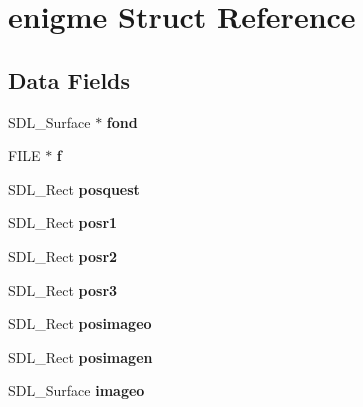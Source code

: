 \hypertarget{structenigme}{}\section{enigme Struct Reference}
\label{structenigme}
\subsection*{Data Fields}
\begin{DoxyCompactItemize}
\item 
S\+D\+L\+\_\+\+Surface $\ast$ {\bfseries fond}\hypertarget{structenigme_a0a53a21d5fa8a66dd6cece93a3d4dedf}{}\label{structenigme_a0a53a21d5fa8a66dd6cece93a3d4dedf}

\item 
F\+I\+LE $\ast$ {\bfseries f}\hypertarget{structenigme_a9ce33d500de045fd29a8aa61c2fc0e1f}{}\label{structenigme_a9ce33d500de045fd29a8aa61c2fc0e1f}

\item 
S\+D\+L\+\_\+\+Rect {\bfseries posquest}\hypertarget{structenigme_af4f18b05a7c628d40ab10f318304b213}{}\label{structenigme_af4f18b05a7c628d40ab10f318304b213}

\item 
S\+D\+L\+\_\+\+Rect {\bfseries posr1}\hypertarget{structenigme_a198924786e9a05bb5b4d04ad8d43ac86}{}\label{structenigme_a198924786e9a05bb5b4d04ad8d43ac86}

\item 
S\+D\+L\+\_\+\+Rect {\bfseries posr2}\hypertarget{structenigme_a50cec981a8a981b124aa557032ea496b}{}\label{structenigme_a50cec981a8a981b124aa557032ea496b}

\item 
S\+D\+L\+\_\+\+Rect {\bfseries posr3}\hypertarget{structenigme_aa0b8e48586298a048a456976e0f76768}{}\label{structenigme_aa0b8e48586298a048a456976e0f76768}

\item 
S\+D\+L\+\_\+\+Rect {\bfseries posimageo}\hypertarget{structenigme_aa9ff126088547313032bbef03b551e02}{}\label{structenigme_aa9ff126088547313032bbef03b551e02}

\item 
S\+D\+L\+\_\+\+Rect {\bfseries posimagen}\hypertarget{structenigme_a343a7b9c26e6fc879f8fc2a2a13af6ec}{}\label{structenigme_a343a7b9c26e6fc879f8fc2a2a13af6ec}

\item 
S\+D\+L\+\_\+\+Surface {\bfseries imageo}\hypertarget{structenigme_ab44163a8aa438b4b2cf3d2f5be37d673}{}\label{structenigme_ab44163a8aa438b4b2cf3d2f5be37d673}


\end{DoxyCompactItemize}

